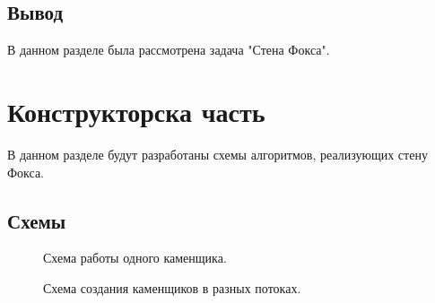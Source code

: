 \documentclass[12pt,a4paper]{report}
\begin{document}
\section*{Вывод}	

В данном разделе была рассмотрена задача "Стена Фокса".



\newpage
\chapter{Конструкторска часть}

В данном разделе будут разработаны схемы алгоритмов, реализующих стену Фокса.


\section{Схемы}



\begin{figure}[h!]
	\caption{Схема работы одного каменщика.}
	\label{fig:image}
\end{figure}


\begin{figure}[h!]
	\caption{Схема создания каменщиков в разных потоках.}
	\label{fig:image}
\end{figure}
\end{document}
